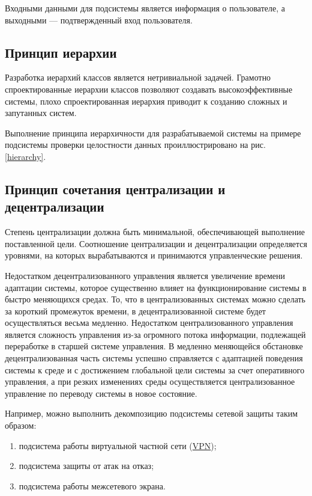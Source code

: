 Входными данными для подсистемы является информация о пользователе, а выходными --- подтвержденный вход пользователя.

\subsection{Принцип иерархии}

Разработка иерархий классов является нетривиальной задачей.
Грамотно спроектированные иерархии классов позволяют создавать высокоэффективные системы, плохо спроектированная иерархия приводит к созданию сложных и запутанных систем.

Выполнение принципа иерархичности для разрабатываемой системы на примере подсистемы проверки целостности данных проиллюстрировано на рис. \ref{hierarchy}.

\subsection{Принцип сочетания централизации и децентрализации}

Степень централизации должна быть минимальной, обеспечивающей выполнение поставленной цели.
Соотношение централизации и децентрализации определяется уровнями, на которых вырабатываются и принимаются управленческие решения.

Недостатком децентрализованного управления является увеличение времени адаптации системы, которое существенно влияет на функционирование системы в быстро меняющихся средах.
То, что в централизованных системах можно сделать за короткий промежуток времени, в децентрализованной системе будет осуществляться весьма медленно.
Недостатком централизованного управления является сложность управления из-за огромного потока информации, подлежащей переработке в старшей системе управления.
В медленно меняющейся обстановке децентрализованная часть системы успешно справляется с адаптацией поведения системы к среде и с достижением глобальной цели системы за счет оперативного управления, а при резких изменениях среды осуществляется централизованное управление по переводу системы в новое состояние.

Например, можно выполнить декомпозицию подсистемы сетевой защиты таким образом:
\begin{enumerate}
  \item подсистема работы виртуальной частной сети (\hyperlink{vpn}{VPN});
  \item подсистема защиты от атак на отказ;
  \item подсистема работы межсетевого экрана.
\end{enumerate}

